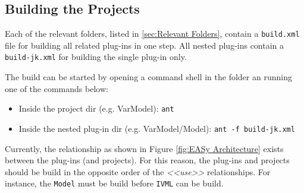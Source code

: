 \subsection{Building the Projects}
\label{sec:Local Build}
Each of the relevant folders, listed in \vref{sec:Relevant Folders}, contain a \texttt{build.xml} file for building all related plug-ins in one step. All nested plug-ins contain a \texttt{build-jk.xml} for building the single plug-in only.

The build can be started by opening a command shell in the folder an running one of the commands below:
\begin{itemize}
	\item Inside the project dir (e.g. VarModel): \texttt{ant}
	\item Inside the nested plug-in dir (e.g. VarModel/Model): \texttt{ant -f build-jk.xml}
\end{itemize}

Currently, the relationship as shown in Figure \vref{fig:EASy Architecture} exists between the plug-ins (and projects). For this reason, the plug-ins and projects should be build in the opposite order of the \textit{<<use>>} relationships. For instance, the \texttt{Model} must be build before \texttt{IVML} can be build.
